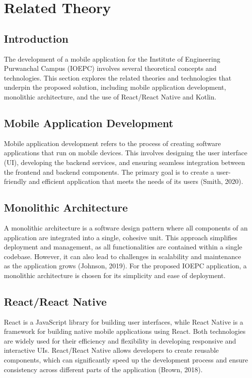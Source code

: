 \chapter{Related Theory}

\section{Introduction}
The development of a mobile application for the Institute of Engineering Purwanchal Campus (IOEPC) involves several theoretical concepts and technologies. This section explores the related theories and technologies that underpin the proposed solution, including mobile application development, monolithic architecture, and the use of React/React Native and Kotlin.

\section{Mobile Application Development}
Mobile application development refers to the process of creating software applications that run on mobile devices. This involves designing the user interface (UI), developing the backend services, and ensuring seamless integration between the frontend and backend components. The primary goal is to create a user-friendly and efficient application that meets the needs of its users (Smith, 2020).

\section{Monolithic Architecture}
A monolithic architecture is a software design pattern where all components of an application are integrated into a single, cohesive unit. This approach simplifies deployment and management, as all functionalities are contained within a single codebase. However, it can also lead to challenges in scalability and maintenance as the application grows (Johnson, 2019). For the proposed IOEPC application, a monolithic architecture is chosen for its simplicity and ease of deployment.

\section{React/React Native}
React is a JavaScript library for building user interfaces, while React Native is a framework for building native mobile applications using React. Both technologies are widely used for their efficiency and flexibility in developing responsive and interactive UIs. React/React Native allows developers to create reusable components, which can significantly speed up the development process and ensure consistency across different parts of the application (Brown, 2018).

